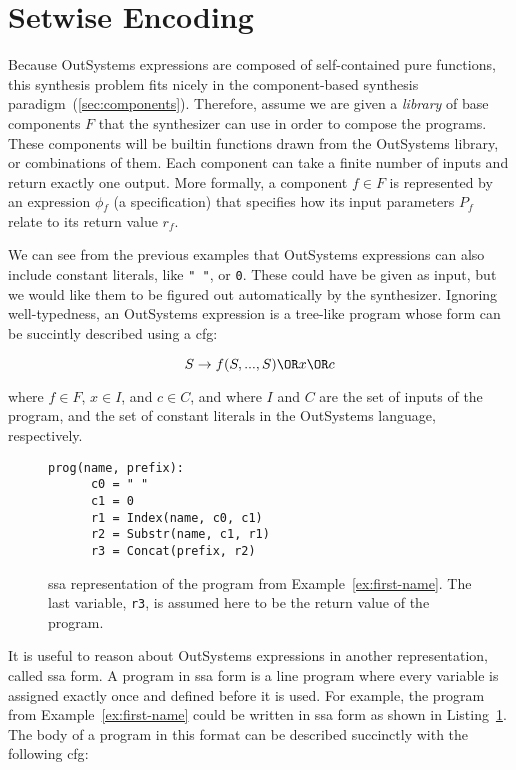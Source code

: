 \section{Setwise Encoding}
\label{sec:setwise-encoding}

Because OutSystems expressions are composed of self-contained pure functions,
this synthesis problem fits nicely in the component-based synthesis
paradigm~(\ref{sec:components}). Therefore, assume we are given a \textit{library}
of base components $F$ that the synthesizer can use in order to compose the
programs. These components will be builtin functions drawn from the OutSystems
library, or combinations of them. Each component can take a finite number of
inputs and return exactly one output. More formally, a component $f \in F$ is
represented by an expression $\phi{}_f$ (a specification) that specifies how its
input parameters $P_f$ relate to its return value $r_f$.

We can see from the previous examples that OutSystems expressions can also
include constant literals, like \lstinline{" "}, or \lstinline{0}. These could
have be given as input, but we would like them to be figured out automatically
by the synthesizer. Ignoring well-typedness, an OutSystems expression is a
tree-like program whose form can be succintly described using a \gls{cfg}:

\[S \rightarrow f(S, ..., S) \OR x \OR c\]

\noindent
where $f \in F$, $x \in I$, and $c \in C$, and where $I$ and $C$ are the set of
inputs of the program, and the set of constant literals in the OutSystems
language, respectively.

\begin{figure}
  \begin{lstlisting}[frame=tlrb]
    prog(name, prefix):
      c0 = " "
      c1 = 0
      r1 = Index(name, c0, c1)
      r2 = Substr(name, c1, r1)
      r3 = Concat(prefix, r2)
  \end{lstlisting}
\caption{\gls{ssa} representation of the program from
    Example~\ref{ex:first-name}. The last variable, \lstinline{r3}, is assumed
    here to be the return value of the program.}
\label{fig:first-name-ssa}
\end{figure}

It is useful to reason about OutSystems expressions in another representation,
called \gls{ssa} form. A program in \gls{ssa} form is a line program where every
variable is assigned exactly once and defined before it is used. For example,
the program from Example~\ref{ex:first-name} could be written in \gls{ssa} form
as shown in Listing~\ref{fig:first-name-ssa}. The body of a program in this
format can be described succinctly with the following \gls{cfg}:

